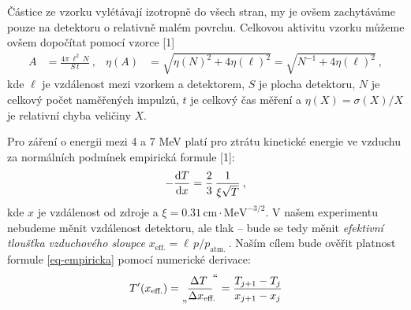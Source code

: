 \documentclass[10pt,a4paper]{article}
\newcommand\kludgequote[1]{%
    \prescript {} {\text{\normalsize„}} {\mkern-1.5mu#1}
    {\vphantom{#1}}^{\mkern-1.5mu\text{\normalsize\raisebox{-0.5ex}{“}}}}
\renewcommand{\U}[1]{\ensuremath{\,\mathrm{#1}}}
\newcommand{\°}{\degree}
\begin{document}
\bigskip

Částice ze vzorku vylétávají izotropně do všech stran, my je ovšem zachytáváme pouze na detektoru o relativně malém povrchu. Celkovou aktivitu vzorku můžeme ovšem dopočítat pomocí vzorce [1]
\begin{align}
    A &= \frac{4\pi \, \ell^2 \, N}{S \, t} \: ,
    &
    \eta(A) &= \sqrt{ \eta(N)^2 + 4\eta(\ell)^2 }
    = \sqrt{ N^{-1} + 4\eta(\ell)^2 } \: ,
    \label{eq-aktivita}
\end{align}
kde $\ell$ je vzdálenost mezi vzorkem a detektorem, $S$ je plocha detektoru, $N$ je celkový počet naměřených impulzů, $t$ je celkový čas měření a $\eta(X) = \sigma(X) / X$ je relativní chyba veličiny $X$.

\bigskip

Pro záření o energii mezi 4 a 7 MeV platí pro ztrátu kinetické energie ve vzduchu za normálních podmínek empirická formule [1]:
\begin{equation}
    -\frac{\text d T}{\text d x} = \frac{2}{3} \, \frac{1}{\xi \sqrt T} \: ,
    \label{eq-empiricka}
\end{equation}
kde $x$ je vzdálenost od zdroje a $\xi = 0.31 \U{cm \cdot MeV^{-3/2}}$. V našem experimentu nebudeme měnit vzdálenost detektoru, ale tlak – bude se tedy měnit \textit{efektivní tloušťka vzduchového sloupce} $x_{\text{eff.}} = \ell \, p / p_{\text{atm.}} \:$. Naším cílem bude ověřit platnost formule \eqref{eq-empiricka} pomocí numerické derivace:
\begin{align}
    T'(x_{\text{eff.}})
    = \kludgequote{ \frac{\Delta T\;}{\Delta x_{\text{eff.}}\!\!} }
    = \frac{T_{j+1} - T_j}{x_{j+1} - x_j}
    \label{eq-deriv}
\end{align}

\bigskip
\end{document}
